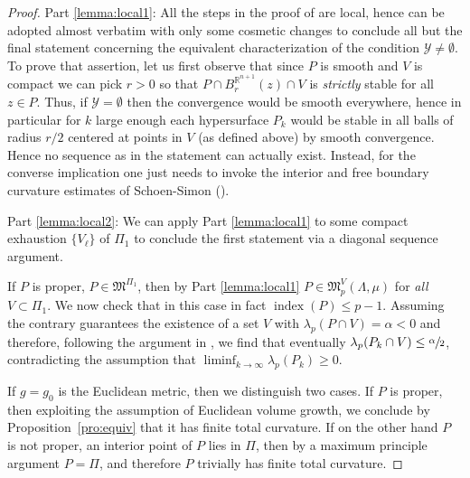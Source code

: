 \documentclass[10pt]{amsart}
\let\mathcal\mathscr
\newcounter{cas}
\DeclareMathOperator{\indx}{index}
\theoremstyle{definition}
\newcommand{\R}{\mathbb{R}}
\begin{document}
\begin{proof}
Part \eqref{lemma:local1}: All the steps in the proof of \cite[Th.\,29]{ACS17} are local, hence can be adopted almost verbatim with only some cosmetic changes to conclude all but the final statement concerning the equivalent characterization of the condition $\mathcal{Y}\neq\emptyset$. To prove that assertion, let us first observe that since $P$ is smooth and $V$ is compact we can pick $r>0$ so that $P\cap B^{\R^{n+1}}_r(z)\cap V$ is \emph{strictly} stable for all $z\in P$. Thus, if $\mathcal{Y}=\emptyset$ then the convergence would be smooth everywhere, hence in particular for $k$ large enough each hypersurface $P_k$ would be stable in all balls of radius $r/2$ centered at points in $V$ (as defined above) by smooth convergence. Hence no sequence as in the statement can actually exist. Instead, for the converse implication one just needs to invoke the interior and free boundary curvature estimates of Schoen-Simon \cite{SS81} (\cf \cite[Th.\,19]{ACS17}).

Part \eqref{lemma:local2}:
We can apply Part \eqref{lemma:local1} to some compact exhaustion $\{V_{\ell}\}$ of $\Pi_1$ to conclude the first statement via a diagonal sequence argument.

If $P$ is proper, \ie $P \in \mathfrak{M}^{\Pi_1}$, then by Part \eqref{lemma:local1} $P\in \mathfrak{M}^V_p(\Lambda, \mu)$ for \emph{all} $V \subset \Pi_1$. We now check that in this case in fact $\indx(P)\leq p-1$. Assuming the contrary guarantees the existence of a set $V$ with $\lambda_p(P\cap V)=\alpha<0$ and therefore, following the argument in \cite[p.\,2599--2600]{ACS15}, we find that eventually $\lambda_p(P_k\cap V)\leq \sfrac{\alpha}{2}$, contradicting the assumption that $\liminf_{k\to\infty}\lambda_p(P_k)\geq 0$.

If $g=g_0$ is the Euclidean metric, then we distinguish two cases. If $P$ is proper, then exploiting the assumption of Euclidean volume growth, we conclude by Proposition~\ref{pro:equiv} that it has finite total curvature. If on the other hand $P$ is not proper, \ie an interior point of $P$ lies in $\Pi$, then by a maximum principle argument $P=\Pi$, and therefore $P$ trivially has finite total curvature.


\end{proof}
\end{document}
